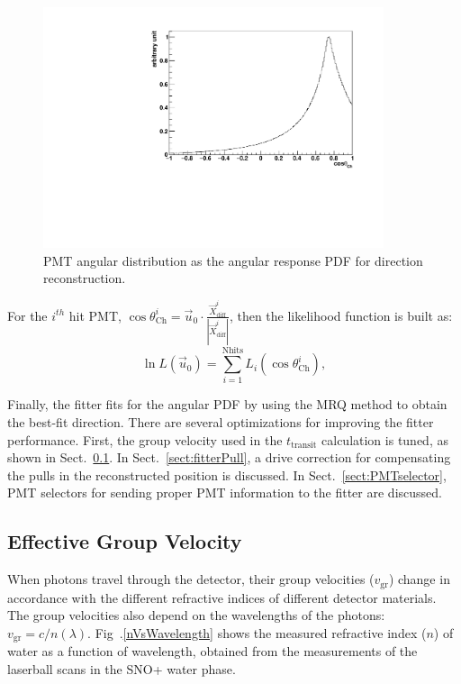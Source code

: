 \begin{figure}[!htb]
	\centering
	\includegraphics[width=10cm]{MPW_angularPDF.pdf}
	\caption{PMT angular distribution as the angular response PDF for direction reconstruction.}
	\label{fig:MPW_angularPDF}
\end{figure}

For the $i^{th}$ hit PMT, $\cos\theta^i_{\mathrm{Ch}}=\vec{u}_0\cdot\frac{\vec{X}^i_{{\mathrm{diff}}}}{|\vec{X}^i_{{\mathrm{diff}}}|}$, then the likelihood function is built as:
\begin{equation}
\ln L(\vec{u}_0)=\sum_{i=1}^{{\mathrm{Nhits}}}L_i(\cos\theta_{\mathrm{Ch}}^i),
\end{equation}

Finally, the fitter fits for the angular PDF by using the MRQ method to obtain the best-fit direction. There are several optimizations for improving the fitter performance. First, the group velocity used in the $t_{\mathrm{transit}}$ calculation is tuned, as shown in Sect.~\ref{sect:tuneGroupVelocity}. In Sect.~\ref{sect:fitterPull}, a drive correction for compensating the pulls in the reconstructed position is discussed. In Sect.~\ref{sect:PMTselector}, PMT selectors for sending proper PMT information to the fitter are discussed. 

\subsection{Effective Group Velocity}\label{sect:tuneGroupVelocity}

When photons travel through the detector, their group velocities ($v_\mathrm{gr}$) change in accordance with the different refractive indices of different detector materials. The group velocities also depend on the wavelengths of the photons: $v_\mathrm{gr}=c/n(\lambda)$. Fig~.\ref{nVsWavelength} shows the measured refractive index ($n$) of water as a function of wavelength, obtained from the measurements of the laserball scans in the SNO+ water phase\cite{laserball_groupVelocity}. %

